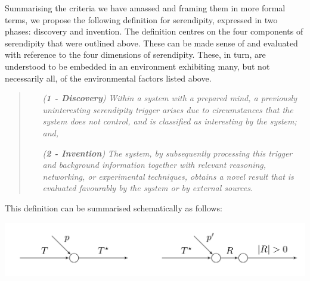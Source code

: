 Summarising the criteria we have amassed and framing them in more
formal terms, we propose the following definition for serendipity,
expressed in two phases: discovery and invention.  The definition
centres on the four components of serendipity that were outlined
above.  These can be made sense of and evaluated with reference to the
four dimensions of serendipity.  These, in turn, are understood to be
embedded in an environment exhibiting many, but not necessarily all,
of the environmental factors listed above.

\begin{quote}
\begin{enumerate}[itemsep=2pt,labelwidth=9em,leftmargin=6em,rightmargin=2em]
\item[\emph{(\textbf{1 - Discovery})}] \emph{Within a system with a prepared mind, a previously uninteresting serendipity trigger arises due to circumstances that the system does not control, and is classified as interesting by the system; and,}
\item[\emph{(\textbf{2 - Invention})}] \emph{The system, by subsequently processing this trigger and background information together with relevant reasoning, networking, or experimental techniques, obtains a novel result that is evaluated favourably by the system or by external sources.}
\end{enumerate}
\end{quote}

\noindent This definition can be summarised schematically as follows:

% 
{\centering
\includegraphics[width=.8\textwidth]{schematic}
\par}

